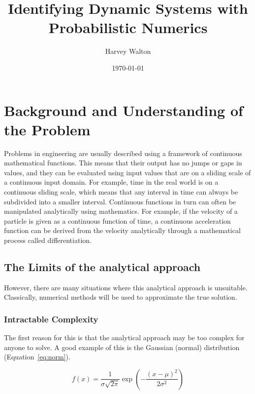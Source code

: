 \documentclass[12pt]{article}
\title{Identifying Dynamic Systems with Probabilistic Numerics}
\author{Harvey Walton}
\date{\today}
\begin{document}

    \thispagestyle{empty}
    


    \tableofcontents
    \newpage


    \section{Background and Understanding of the Problem}


    Problems in engineering are usually described using a framework of continuous mathematical functions.
    This means that their output has no jumps or gaps in values, and they can be evaluated using input values that are on a sliding scale of a continuous input domain.
    For example, time in the real world is on a continuous sliding scale, which means that any interval in time can always be subdivided into a smaller interval.
    Continuous functions in turn can often be manipulated analytically using mathematics.
    For example, if the velocity of a particle is given as a continuous function of time, a continuous acceleration function can be derived from the velocity analytically through a mathematical process called differentiation.

    \subsection{The Limits of the analytical approach}

    However, there are many situations where this analytical approach is unsuitable.
    Classically, numerical methods will be used to approximate the true solution.

    \subsubsection{Intractable Complexity}\label{subsubsec:int-comp}

    The first reason for this is that the analytical approach may be too complex for anyone to solve.
    A good example of this is the Gaussian (normal) distribution (Equation~\ref{eq:norm}). %

    \begin{equation}
        f(x) = \frac{1}{\sigma\sqrt{2\pi}} \exp\left(-\frac{(x - \mu)^2}{2\sigma^2}\right)\label{eq:norm}
    \end{equation}
\end{document}

